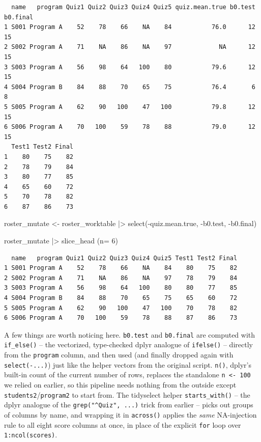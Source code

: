 \documentclass[
  letterpaper,
  DIV=11,
  numbers=noendperiod]{scrreprt}
\newenvironment{Shaded}{\begin{snugshade}}{\end{snugshade}}
\newcommand{\AttributeTok}[1]{\textcolor[rgb]{0.40,0.45,0.13}{#1}}
\newcommand{\DecValTok}[1]{\textcolor[rgb]{0.68,0.00,0.00}{#1}}
\newcommand{\FunctionTok}[1]{\textcolor[rgb]{0.28,0.35,0.67}{#1}}
\newcommand{\NormalTok}[1]{\textcolor[rgb]{0.00,0.23,0.31}{#1}}
\newcommand{\OtherTok}[1]{\textcolor[rgb]{0.00,0.23,0.31}{#1}}
\newcommand{\SpecialCharTok}[1]{\textcolor[rgb]{0.37,0.37,0.37}{#1}}
\begin{document}
\begin{verbatim}
  name   program Quiz1 Quiz2 Quiz3 Quiz4 Quiz5 quiz.mean.true b0.test b0.final
1 S001 Program A    52    78    66    NA    84           76.0      12       15
2 S002 Program A    71    NA    86    NA    97             NA      12       15
3 S003 Program A    56    98    64   100    80           79.6      12       15
4 S004 Program B    84    88    70    65    75           76.4       6        8
5 S005 Program A    62    90   100    47   100           79.8      12       15
6 S006 Program A    70   100    59    78    88           79.0      12       15
  Test1 Test2 Final
1    80    75    82
2    78    79    84
3    80    77    85
4    65    60    72
5    70    78    82
6    87    86    73
\end{verbatim}

\begin{Shaded}
\begin{Highlighting}[]
\NormalTok{roster\_mutate }\OtherTok{\textless{}{-}}\NormalTok{ roster\_worktable }\SpecialCharTok{|\textgreater{}} \FunctionTok{select}\NormalTok{(}\SpecialCharTok{{-}}\NormalTok{quiz.mean.true, }\SpecialCharTok{{-}}\NormalTok{b0.test, }\SpecialCharTok{{-}}\NormalTok{b0.final) }

\NormalTok{roster\_mutate }\SpecialCharTok{|\textgreater{}} \FunctionTok{slice\_head}\NormalTok{ (}\AttributeTok{n=} \DecValTok{6}\NormalTok{)}
\end{Highlighting}
\end{Shaded}

\begin{verbatim}
  name   program Quiz1 Quiz2 Quiz3 Quiz4 Quiz5 Test1 Test2 Final
1 S001 Program A    52    78    66    NA    84    80    75    82
2 S002 Program A    71    NA    86    NA    97    78    79    84
3 S003 Program A    56    98    64   100    80    80    77    85
4 S004 Program B    84    88    70    65    75    65    60    72
5 S005 Program A    62    90   100    47   100    70    78    82
6 S006 Program A    70   100    59    78    88    87    86    73
\end{verbatim}

A few things are worth noticing here. \texttt{b0.test} and
\texttt{b0.final} are computed with \texttt{if\_else()} -- the
vectorized, type-checked dplyr analogue of \texttt{ifelse()} -- directly
from the \texttt{program} column, and then used (and finally dropped
again with \texttt{select(-...)}) just like the helper vectors from the
original script. \texttt{n()}, dplyr's built-in count of the current
number of rows, replaces the standalone \texttt{n\ \textless{}-\ 100} we
relied on earlier, so this pipeline needs nothing from the outside
except \texttt{students2}/\texttt{program2} to start from. The
tidyselect helper \texttt{starts\_with()} -- the dplyr analogue of the
\texttt{grep("\^{}Quiz",\ ...)} trick from earlier -- picks out groups
of columns by name, and wrapping it in \texttt{across()} applies the
\emph{same} NA-injection rule to all eight score columns at once, in
place of the explicit \texttt{for} loop over \texttt{1:ncol(scores)}.
\end{document}
